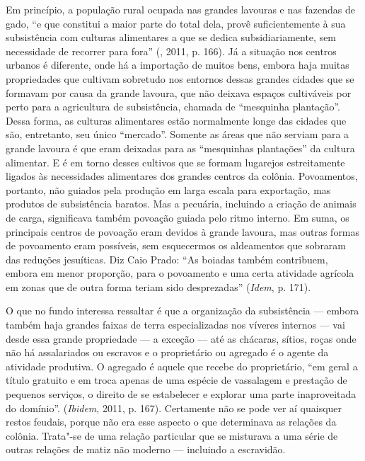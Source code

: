 Em princípio, a população rural ocupada nas grandes lavouras e nas
fazendas de gado, ``e que constitui a maior parte do total dela, provê
suficientemente à sua subsistência com culturas alimentares a que se
dedica subsidiariamente, sem necessidade de recorrer para fora''
(, 2011, p. 166). Já a situação nos centros urbanos é diferente,
onde há a importação de muitos bens, embora haja muitas propriedades que
cultivam sobretudo nos entornos dessas grandes cidades que se formavam
por causa da grande lavoura, que não deixava espaços cultiváveis por
perto para a agricultura de subsistência, chamada de ``mesquinha
plantação''. Dessa forma, as culturas alimentares estão normalmente
longe das cidades que são, entretanto, seu único ``mercado''. Somente as
áreas que não serviam para a grande lavoura é que eram deixadas para as
``mesquinhas plantações'' da cultura alimentar. E é em torno desses
cultivos que se formam lugarejos estreitamente ligados às necessidades
alimentares dos grandes centros da colônia. Povoamentos, portanto, não
guiados pela produção em larga escala para exportação, mas produtos de
subsistência baratos. Mas a pecuária, incluindo a criação de
animais de carga, significava também povoação guiada pelo ritmo interno.
Em suma, os principais centros de povoação eram devidos à grande
lavoura, mas outras formas de povoamento eram possíveis, sem esquecermos
os aldeamentos que sobraram das reduções jesuíticas. Diz Caio Prado:
``As boiadas também contribuem, embora em menor proporção, para o
povoamento e uma certa atividade agrícola em zonas que de outra forma
teriam sido desprezadas'' (\emph{Idem}, p. 171).

O que no fundo interessa ressaltar é que a organização da subsistência
--- embora também haja grandes faixas de terra especializadas nos víveres
internos --- vai desde essa grande propriedade --- a exceção --- até as
chácaras, sítios, roças onde não há assalariados ou escravos e o
proprietário ou agregado é o agente da atividade produtiva.
O agregado é aquele que recebe
do proprietário, ``em geral a título gratuito e em troca apenas de uma
espécie de vassalagem e prestação de pequenos serviços, o direito de se
estabelecer e explorar uma parte inaproveitada do domínio''.
(\emph{Ibidem}, 2011, p. 167). Certamente não se pode ver aí quaisquer
restos feudais, porque não era esse aspecto o que determinava as
relações da colônia. Trata"-se de uma relação particular que se misturava
a uma série de outras relações de matiz não moderno --- incluindo a
escravidão.

